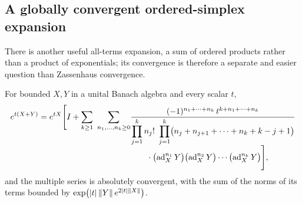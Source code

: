 \subsection{A globally convergent ordered-simplex expansion}
There is another useful all-terms expansion, a sum of ordered products
rather than a product of exponentials; its convergence is therefore a
separate and easier question than Zassenhaus convergence.
\begin{theorem}\label{thm:simplex}
For bounded $X,Y$ in a unital Banach algebra and every scalar $t$,
\begin{equation}\label{eq:simplex}
\begin{split}
 e^{t(X+Y)}=e^{tX}\Biggl[I+\sum_{k\geq1}\ \sum_{n_1,\ldots,n_k\geq0}
 &\frac{(-1)^{n_1+\cdots+n_k}\,t^{k+n_1+\cdots+n_k}}
 {\displaystyle\prod_{j=1}^{k}n_j!\ \prod_{j=1}^{k}\bigl(n_j+n_{j+1}+\cdots+n_k+k-j+1\bigr)}\\[-4pt]
 &\qquad\cdot\bigl(\ad_X^{n_1}Y\bigr)\bigl(\ad_X^{n_2}Y\bigr)\cdots\bigl(\ad_X^{n_k}Y\bigr)\Biggr],
\end{split}
\end{equation}
and the multiple series is absolutely convergent, with the sum of the norms
of its terms bounded by $\exp\bigl(|t|\left\lVert Y\right\rVert e^{2|t|\left\lVert X\right\rVert}\bigr)$.
\end{theorem}
